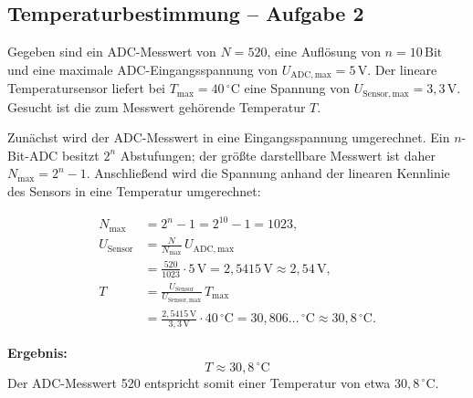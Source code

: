\clearpage
\subsection{Temperaturbestimmung -- Aufgabe 2}

Gegeben sind ein ADC-Messwert von $N=520$, eine Aufl\"osung von
$n=10\,\mathrm{Bit}$ und eine maximale ADC-Eingangsspannung von
$U_{\mathrm{ADC,max}}=5\,\mathrm{V}$. Der lineare Temperatursensor liefert bei
$T_{\max}=40\,^\circ\mathrm{C}$ eine Spannung von
$U_{\mathrm{Sensor,max}}=3{,}3\,\mathrm{V}$. Gesucht ist die zum Messwert
geh\"orende Temperatur $T$.

Zun\"achst wird der ADC-Messwert in eine Eingangsspannung umgerechnet. Ein
$n$-Bit-ADC besitzt $2^n$ Abstufungen; der gr\"o{\ss}te darstellbare Messwert
ist daher $N_{\max}=2^n-1$. Anschlie{\ss}end wird die Spannung anhand der
linearen Kennlinie des Sensors in eine Temperatur umgerechnet:

\begin{align*}
N_{\max}
    &= 2^n - 1
     = 2^{10} - 1
     = 1023, \\
U_{\mathrm{Sensor}}
    &= \frac{N}{N_{\max}}\,U_{\mathrm{ADC,max}} \\
    &= \frac{520}{1023}\cdot 5\,\mathrm{V}
     = 2{,}5415\,\mathrm{V}
     \approx 2{,}54\,\mathrm{V}, \\
T
    &= \frac{U_{\mathrm{Sensor}}}{U_{\mathrm{Sensor,max}}}\,T_{\max} \\
    &= \frac{2{,}5415\,\mathrm{V}}{3{,}3\,\mathrm{V}}
       \cdot 40\,^\circ\mathrm{C}
     = 30{,}806\ldots\,^\circ\mathrm{C}
     \approx 30{,}8\,^\circ\mathrm{C}.
\end{align*}

\noindent\textbf{Ergebnis:}
\[
    \boxed{T \approx 30{,}8\,^\circ\mathrm{C}}
\]
Der ADC-Messwert 520 entspricht somit einer Temperatur von etwa
$30{,}8\,^\circ\mathrm{C}$.

